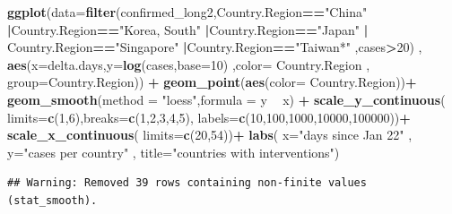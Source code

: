 \documentclass[]{article}
\newenvironment{Shaded}{\begin{snugshade}}{\end{snugshade}}
\newcommand{\DataTypeTok}[1]{\textcolor[rgb]{0.13,0.29,0.53}{#1}}
\newcommand{\DecValTok}[1]{\textcolor[rgb]{0.00,0.00,0.81}{#1}}
\newcommand{\KeywordTok}[1]{\textcolor[rgb]{0.13,0.29,0.53}{\textbf{#1}}}
\newcommand{\NormalTok}[1]{#1}
\newcommand{\OperatorTok}[1]{\textcolor[rgb]{0.81,0.36,0.00}{\textbf{#1}}}
\newcommand{\StringTok}[1]{\textcolor[rgb]{0.31,0.60,0.02}{#1}}
\begin{document}
\begin{Shaded}
\begin{Highlighting}[]
\KeywordTok{ggplot}\NormalTok{(}\DataTypeTok{data=}\KeywordTok{filter}\NormalTok{(confirmed_long2,Country.Region}\OperatorTok{==}\StringTok{"China"} \OperatorTok{|}\NormalTok{Country.Region}\OperatorTok{==}\StringTok{"Korea, South"} \OperatorTok{|}\NormalTok{Country.Region}\OperatorTok{==}\StringTok{"Japan"} \OperatorTok{|}\StringTok{ }\NormalTok{Country.Region}\OperatorTok{==}\StringTok{"Singapore"} \OperatorTok{|}\NormalTok{Country.Region}\OperatorTok{==}\StringTok{"Taiwan*"}\NormalTok{    ,cases}\OperatorTok{>}\DecValTok{20}\NormalTok{) , }\KeywordTok{aes}\NormalTok{(}\DataTypeTok{x=}\NormalTok{delta.days,}\DataTypeTok{y=}\KeywordTok{log}\NormalTok{(cases,}\DataTypeTok{base=}\DecValTok{10}\NormalTok{) ,}\DataTypeTok{color=}\NormalTok{ Country.Region , }\DataTypeTok{group=}\NormalTok{Country.Region)) }\OperatorTok{+}
\StringTok{  }\KeywordTok{geom_point}\NormalTok{(}\KeywordTok{aes}\NormalTok{(}\DataTypeTok{color=}\NormalTok{ Country.Region))}\OperatorTok{+}
\StringTok{    }\KeywordTok{geom_smooth}\NormalTok{(}\DataTypeTok{method =} \StringTok{"loess"}\NormalTok{,}\DataTypeTok{formula =}\NormalTok{ y }\OperatorTok{~}\StringTok{ }\NormalTok{x) }\OperatorTok{+}\StringTok{ }
\StringTok{  }\KeywordTok{scale_y_continuous}\NormalTok{( }\DataTypeTok{limits=}\KeywordTok{c}\NormalTok{(}\DecValTok{1}\NormalTok{,}\DecValTok{6}\NormalTok{),}\DataTypeTok{breaks=}\KeywordTok{c}\NormalTok{(}\DecValTok{1}\NormalTok{,}\DecValTok{2}\NormalTok{,}\DecValTok{3}\NormalTok{,}\DecValTok{4}\NormalTok{,}\DecValTok{5}\NormalTok{), }\DataTypeTok{labels=}\KeywordTok{c}\NormalTok{(}\DecValTok{10}\NormalTok{,}\DecValTok{100}\NormalTok{,}\DecValTok{1000}\NormalTok{,}\DecValTok{10000}\NormalTok{,}\DecValTok{100000}\NormalTok{))}\OperatorTok{+}
\StringTok{   }\KeywordTok{scale_x_continuous}\NormalTok{( }\DataTypeTok{limits=}\KeywordTok{c}\NormalTok{(}\DecValTok{20}\NormalTok{,}\DecValTok{54}\NormalTok{))}\OperatorTok{+}
\StringTok{  }\KeywordTok{labs}\NormalTok{( }\DataTypeTok{x=}\StringTok{"days since Jan 22"}\NormalTok{ , }\DataTypeTok{y=}\StringTok{"cases per country"}\NormalTok{ , }\DataTypeTok{title=}\StringTok{"countries with interventions"}\NormalTok{)}
\end{Highlighting}
\end{Shaded}

\begin{verbatim}
## Warning: Removed 39 rows containing non-finite values (stat_smooth).
\end{verbatim}
\end{document}
